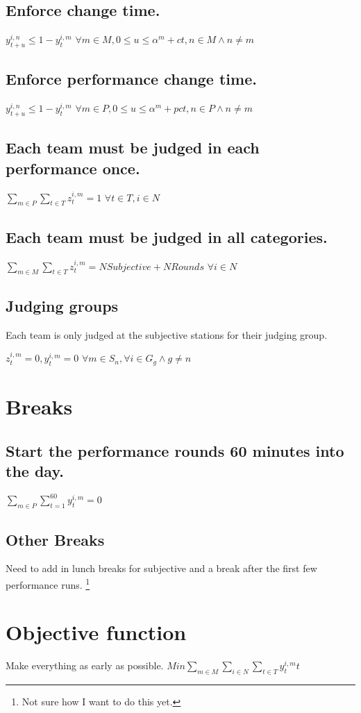 \documentclass[letterpaper,11pt]{report}
\newcommand{\doccomment}[3]%
{\marginpar{\textcolor{#2}{\bf #1}}%
\footnote{{\color{#2}#3}}%
}
\newcommand{\doccomment}[3]{}
\newcommand{\jpscomment}[1]%
{\doccomment{SCHEWE}{Bittersweet}{#1}}
\begin{document}
\subsection{Enforce change time.}
$y_{t+u}^{i,n} \le 1 - y_{t}^{i,m}$
\hfill $\forall m \in M, 0 \le u \le \alpha^{m} + ct, n \in M \wedge n \neq m$

\subsection{Enforce performance change time.}
$y_{t+u}^{i,n} \le 1 - y_{t}^{i,m}$
\hfill $\forall m \in P, 0 \le u \le \alpha^{m} + pct, n \in P \wedge n \neq m$

\subsection{Each team must be judged in each performance once.}
$\sum\limits_{m \in P} \sum\limits_{t \in T} z_{t}^{i,m} = 1$
\hfill $\forall t \in T, i \in N$


\subsection{Each team must be judged in all categories.}
$\sum\limits_{m \in M} \sum\limits_{t \in T} z_{t}^{i,m} = NSubjective +
NRounds$
\hfill $\forall i \in N$

\subsection{Judging groups}
Each team is only judged at the subjective stations for their judging
group.

$z_{t}^{i,m} = 0, y_{t}^{i,m} = 0$
\hfill $\forall m \in S_{n}, \forall i \in G_{g} \wedge g \neq n$

\section{Breaks}
\subsection{Start the performance rounds 60 minutes into the day.}
$\sum\limits_{m \in P} \sum\limits_{t = 1}^{60} y_{t}^{i,m} = 0$

\subsection{Other Breaks}
Need to add in lunch breaks for subjective and a break after the first few
performance runs. \jpscomment{Not sure how I want to do this yet.}

\section{Objective function}
Make everything as early as possible.
$Min \sum\limits_{m \in M} \sum\limits_{i \in N} \sum\limits_{t \in T}
y_{t}^{i,m} t$
\end{document}

